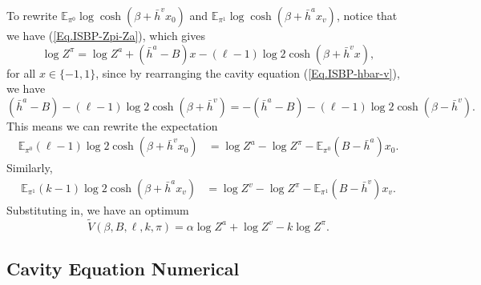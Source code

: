 \documentclass[12pt]{article}
\numberwithin{equation}{section}
\begin{document}
To rewrite $\mathbb{E}_{\pi^0} \log\cosh(\beta + \bar{h}^v x_0)$ and $\mathbb{E}_{\pi^1} \log\cosh(\beta + \bar{h}^a x_v)$,
notice that we have (\ref{Eq.ISBP-Zpi-Za}), which gives
\begin{equation}
    \log Z^\pi = \log Z^a + (\bar{h}^a - B)x - (\ell - 1) \log 2\cosh(\beta + \bar{h}^v x),
\end{equation}
for all $x\in\{-1, 1\}$, since by rearranging the cavity equation (\ref{Eq.ISBP-hbar-v}), we have
\begin{equation*}
    (\bar{h}^a - B) - (\ell - 1) \log 2\cosh(\beta + \bar{h}^v) = -(\bar{h}^a - B) - (\ell - 1) \log 2\cosh(\beta - \bar{h}^v).
\end{equation*}
This means we can rewrite the expectation
\begin{align*}
    \mathbb{E}_{\pi^0} (\ell - 1) \log2\cosh(\beta + \bar{h}^v x_0) & = \log Z^a - \log Z^\pi - \mathbb{E}_{\pi^0} (B - \bar{h}^a)x_0.
\end{align*}
Similarly,
\begin{align*}
    \mathbb{E}_{\pi^1} (k - 1) \log2\cosh(\beta + \bar{h}^a x_v) & = \log Z^v - \log Z^\pi - \mathbb{E}_{\pi^1} (B - \bar{h}^v)x_v.
\end{align*}
Substituting in, we have an optimum
\begin{equation}
    \widetilde{V}(\beta, B, \ell, k, \pi) = \alpha \log Z^a + \log Z^v - k \log Z^\pi.
    \label{Eq.ISBP-AP-Z-form}
\end{equation}

\subsection{Cavity Equation Numerical}
\end{document}
